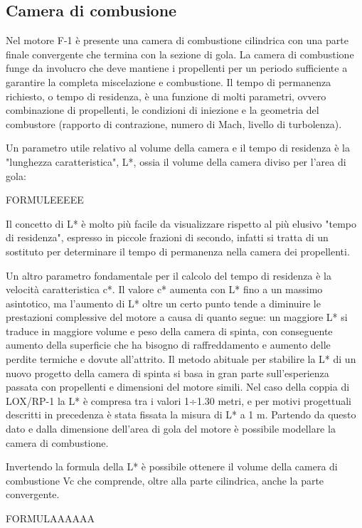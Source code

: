 \subsection{Camera di combusione}
\label{subsec:camera_di_combustione}

Nel motore F-1 è presente una camera di combustione cilindrica con una parte finale convergente che termina con la sezione di gola.
La camera di combustione funge da involucro che deve mantiene i propellenti per un periodo sufficiente a garantire la completa miscelazione e combustione. Il tempo di permanenza richiesto, o tempo di residenza, è una funzione di molti parametri, ovvero combinazione di propellenti, le condizioni di iniezione e la geometria del combustore (rapporto di contrazione, numero di Mach, livello di turbolenza).

Un parametro utile relativo al volume della camera e il tempo di residenza è la "lunghezza caratteristica", L*, ossia il volume della camera diviso per l’area di gola:

FORMULEEEEE


Il concetto di L* è molto più facile da visualizzare rispetto al più elusivo "tempo di residenza", espresso in piccole frazioni di secondo, infatti si tratta di un sostituto per determinare il tempo di permanenza nella camera dei propellenti.

Un altro parametro fondamentale per il calcolo del tempo di residenza è la velocità caratteristica c*.
Il valore c* aumenta con L* fino a un massimo asintotico, ma l’aumento di L* oltre un certo punto tende a diminuire le prestazioni complessive del motore a causa di quanto segue: un maggiore L* si traduce in maggiore volume e peso della camera di spinta, con conseguente aumento della superficie che ha bisogno di raffreddamento e aumento delle perdite termiche e dovute all’attrito.
Il metodo abituale per stabilire la L* di un nuovo progetto della camera di spinta si basa in gran parte sull'esperienza passata con propellenti e dimensioni del motore simili. 
Nel caso della coppia di LOX/RP-1 la L* è compresa tra i valori 1÷1.30 metri, e per motivi progettuali descritti in precedenza è stata fissata la misura di L* a 1 m.
Partendo da questo dato e dalla dimensione dell’area di gola del motore è possibile modellare la camera di combustione.

Invertendo la formula della L* è possibile ottenere il volume della camera di combustione Vc che comprende, oltre alla parte cilindrica, anche la parte convergente.

FORMULAAAAAA

